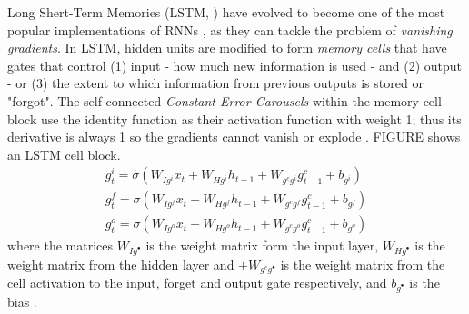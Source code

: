 \documentclass[a4paper, 11pt]{article}
\begin{document}
Long Shert-Term Memories (LSTM, \cite{Hochreiter.1997}) have evolved to become one of the most popular implementations of RNNs \citep{George.2017,Salehinejad.12292017}, as they can tackle the problem of \textit{vanishing gradients}. In LSTM, hidden units are modified to form \textit{memory cells} that have gates that control (1) input - how much new information is used - and (2) output  - or (3) the extent to which information from previous outputs is stored or "forgot". The self-connected \textit{Constant Error Carousels} within the memory cell block use the identity function as their activation function with weight 1; thus its derivative is always 1 so the gradients cannot vanish or explode \citep{Schmidhuber.2015}.
FIGURE shows an LSTM cell block.
\begin{align}
g^{i}_{t} = \sigma(W_{Ig^{i}}x_{t} + W_{Hg^{i}}h_{t-1}+W_{g^{c}g^{i}}g^{c}_{t-1} + b_{g^{i}}) \\
g^{f}_{t} = \sigma(W_{Ig^{f}}x_{t} + W_{Hg^{f}}h_{t-1}+W_{g^{c}g^{f}}g^{c}_{t-1} + b_{g^{f}}) \\
g^{o}_{t} = \sigma(W_{Ig^{o}}x_{t} + W_{Hg^{o}}h_{t-1}+W_{g^{c}g^{o}}g^{c}_{t-1} + b_{g^{o}}) 
\end{align}
where the matrices $W_{Ig^{\bullet}}$ is the weight matrix form the input layer, $W_{Hg^{\bullet}}$ is the weight matrix from the hidden layer and $+W_{g^{c}g^{\bullet}}$ is the weight matrix from the cell activation to the input, forget and output gate respectively, and $b_{g^{\bullet}}$ is the bias \citep{Salehinejad.12292017}.
\end{document}
